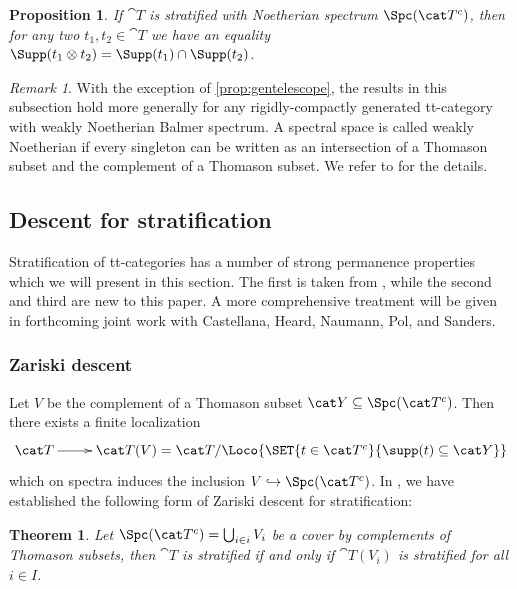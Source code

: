 \documentclass{amsart}%
\numberwithin{equation}{section}%
\newtheorem{Thm}[equation]{Theorem}
\newtheorem{Prop}[equation]{Proposition}
\theoremstyle{remark}
\newtheorem{Rem}[equation]{Remark}
\begin{document}
\begin{Prop}\label{prop:tensorproductformula}
If $\cat T$ is stratified with Noetherian spectrum $\Spc(\cat T^c)$, then for any two $t_1,t_2 \in \cat T$ we have an equality $\Supp(t_1 \otimes t_2) = \Supp(t_1) \cap \Supp(t_2)$.
\end{Prop}

\begin{Rem}\label{rem:weaklynoetherian}
With the exception of \cref{prop:gentelescope}, the results in this subsection hold more generally for any rigidly-compactly generated tt-category with weakly Noetherian Balmer spectrum. A spectral space is called weakly Noetherian if every singleton can be written as an intersection of a Thomason subset and the complement of a Thomason subset. We refer to \cite{bhs1} for the details. 
\end{Rem}


\subsection{Descent for stratification}\label{ssec:stratificationdescent}

Stratification of tt-categories has a number of strong permanence properties which we will present in this section. The first is taken from \cite{bhs1}, while the second and third are new to this paper. A more comprehensive treatment will be given in forthcoming joint work with  Castellana, Heard, Naumann, Pol, and Sanders. 

\subsubsection{Zariski descent}

Let $V$ be the complement of a Thomason subset $\cat Y \subseteq \Spc(\cat T^c)$. Then there exists a finite localization 
\[
\xymatrix{\cat T \ar[r] & \cat T(V) = \cat T/\Loco{\SET{t \in \cat T^c}{\supp(t) \subseteq \cat Y}}}
\]
which on spectra induces the inclusion $V \hookrightarrow \Spc(\cat T^c)$. In \cite[Cor.~5.5]{bhs1}, we have established the following form of Zariski descent for stratification:

\begin{Thm}\label{thm:zariskidescent}
Let $\Spc(\cat T^c) = \bigcup_{i\in i}V_i$ be a cover by complements of Thomason subsets, then $\cat T$ is stratified if and only if $\cat T(V_i)$ is stratified for all $i\in I$.
\end{Thm}
\end{document}
